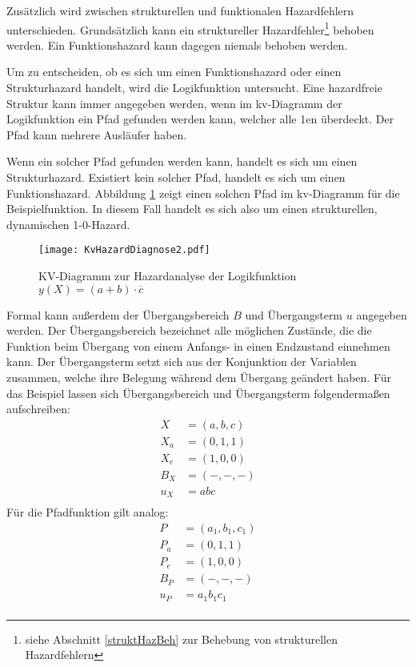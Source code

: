 Zusätzlich wird zwischen strukturellen und funktionalen Hazardfehlern unterschieden. Grundsätzlich kann ein struktureller Hazardfehler\footnote{siehe Abschnitt \ref{struktHazBeh} zur Behebung von strukturellen Hazardfehlern} behoben werden. Ein Funktionshazard kann dagegen niemals behoben werden.

Um zu entscheiden, ob es sich um einen Funktionshazard oder einen Strukturhazard handelt, wird die Logikfunktion untersucht. Eine hazardfreie Struktur kann immer angegeben werden, wenn im {\sc kv}-Diagramm der Logikfunktion ein Pfad gefunden werden kann, welcher alle 1en überdeckt. Der Pfad kann mehrere Ausläufer haben. 

Wenn ein solcher Pfad gefunden werden kann, handelt es sich um einen Strukturhazard. Existiert kein solcher Pfad, handelt es sich um einen Funktionshazard. Abbildung \ref{KvHazDiag2} zeigt einen solchen Pfad im {\sc kv}-Diagramm für die Beispielfunktion. In diesem Fall handelt es sich also um einen strukturellen, dynamischen 1-0-Hazard.
\begin{figure}[htp]
	\centering
	\texttt{[image: KvHazardDiagnose2.pdf]}
	\caption{KV-Diagramm zur Hazardanalyse der Logikfunktion $y(X) = (a + b) \cdot \overline{c}$}
	\label{KvHazDiag2}
\end{figure}

Formal kann außerdem der Übergangsbereich $B$ und Übergangsterm $u$ angegeben werden. Der Übergangsbereich bezeichnet alle möglichen Zustände, die die Funktion beim Übergang von einem Anfangs- in einen Endzustand einnehmen kann. Der Übergangsterm setzt sich aus der Konjunktion der Variablen zusammen, welche ihre Belegung während dem Übergang geändert haben. Für das Beispiel lassen sich Übergangsbereich und Übergangsterm folgendermaßen aufschreiben:
\begin{align*}
X   &= (a,b,c) \\
X_a &= (0,1,1) \\
X_e &= (1,0,0) \\
B_X &= (-,-,-) \\
u_X &= abc     \\
\end{align*}
Für die Pfadfunktion gilt analog:
\begin{align*}
P   &= (a_1,b_1,c_1) \\
P_a &= (0,1,1)       \\
P_e &= (1,0,0)       \\
B_P &= (-,-,-)       \\
u_P &= a_1b_1c_1     \\
\end{align*}


